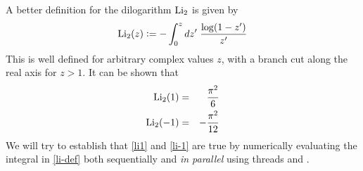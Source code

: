 %
%
%
%

\pagestyle{headandfoot}
\runningfootrule
{}
\runningheader{}{}{}
\firstpagefooter{}{}{}



\def\Li{\mbox{\rm Li}_{2}}
\def\len{\mbox{\rm length}}
\def\dilog{\mbox{\tt dilog}}

A better definition for the dilogarithm $\Li$ is given by
%
\begin{equation}
\Li(z) \bydef
- \int_{0}^{z} dz' \; \frac{\log(1-z')}{z'} \label{eq:li-def}
\end{equation}
%
This is well defined for arbitrary complex values $z$, with a branch cut along the real axis
for $z > 1$. It can be shown that
%
\begin{eqnarray}
  \Li(1)  & = & \frac{\pi^{2}}{6} \label{eq:li1} \\
  \Li(-1) & = & - \frac{\pi^{2}}{12} \label{eq:li-1}
\end{eqnarray}
%
We will try to establish that \eqref{li1} and \eqref{li-1} are true by numerically evaluating
the integral in \eqref{li-def} both sequentially and {\em in parallel} using threads and \mpi.
%

